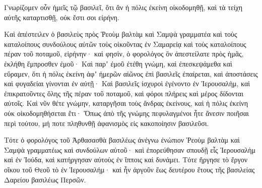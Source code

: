{Γνωρίζομεν οὖν ἡμεῖς τῷ βασιλεῖ, ὅτι ἂν ἡ πόλις ἐκείνη οἰκοδομηθῇ, καὶ τὰ τείχη αὐτῆς καταρτισθῇ, οὐκ ἔστι σοι εἰρήνη.
\par }{\PP {}Καὶ ἀπέστειλεν ὁ βασιλεὺς πρὸς Ῥεοὺμ βαλτὰμ καὶ Σαμψὰ γραμματέα καὶ τοὺς καταλοίπους συνδούλους αὐτῶν τοὺς οἰκοῦντας ἐν Σαμαρείᾳ καὶ τοὺς καταλοίπους πέραν τοῦ ποταμοῦ, εἰρήνην· καὶ φησὶν,
ὁ φορολόγος ὃν ἀπεστείλατε πρὸς ἡμᾶς, ἐκλήθη ἔμπροσθεν ἐμοῦ·
Καὶ παρʼ ἐμοῦ ἐτέθη γνώμη, καὶ ἐπεσκεψάμεθα καὶ εὕραμεν, ὅτι ἡ πόλις ἐκείνη ἀφʼ ἡμερῶν αἰῶνος ἐπὶ βασιλεῖς ἐπαίρεται, καὶ ἀποστάσεις καὶ φυγαδείαι γίνονται ἐν αὐτῇ·
Καὶ βασιλεῖς ἰσχυροὶ ἐγένοντο ἐν Ἱερουσαλὴμ, καὶ ἐπικρατοῦντες ὅλης τῆς πέραν τοῦ ποταμοῦ, καὶ φόροι πλήρεις καὶ μέρος δίδονται αὐτοῖς.
Καὶ νῦν θέτε γνώμην, καταργῆσαι τοὺς ἄνδρας ἐκείνους, καὶ ἡ πόλις ἐκείνη οὐκ οἰκοδομηθήσεται ἔτι· Ὅπως ἀπὸ τῆς γνώμης
πεφυλαγμένοι ἦτε ἄνεσιν ποιῆσαι περὶ τούτου, μή ποτε πληθυνθῇ ἀφανισμὸς εἰς κακοποίησιν βασιλεῦσι.
\par }{\PP {}Τότε ὁ φορολόγος τοῦ Ἀρθασασθὰ βασιλέως ἀνέγνω ἐνώπιον Ῥεοὺμ βαλτὰμ καὶ Σαμψὰ γραμματέως καὶ συνδούλων αὐτοῦ· καὶ ἐπορεύθησαν σπουδῇ εἶς Ἱερουσαλὴμ καὶ ἐν Ἰούδα, καὶ κατήργησαν αὐτοὺς ἐν ἵπποις καὶ δυνάμει.
Τότε ἤργησε τὸ ἔργον οἴκου τοῦ Θεοῦ τὸ ἐν Ἱερουσαλήμ· καὶ ἦν ἀργοῦν ἕως δευτέρου ἔτους τῆς βασιλείας Δαρείου βασιλέως Περσῶν.

}
